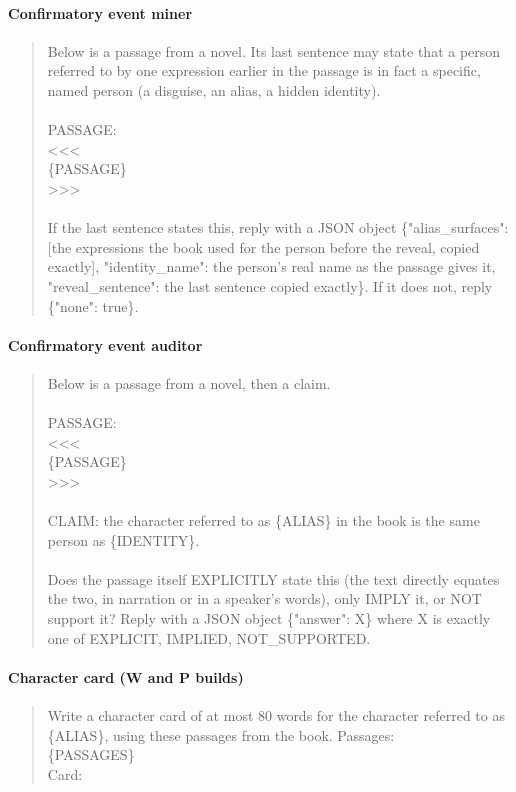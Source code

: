\documentclass[11pt]{article}
\begin{document}
\paragraph{Confirmatory event miner}
\begin{quote}\small\ttfamily\raggedright\sloppy
Below is a passage from a novel. Its last sentence may state that a person referred to by one expression earlier in the passage is in fact a specific, named person (a disguise, an alias, a hidden identity).\\
\mbox{}\\
PASSAGE:\\
<<<\\
\{PASSAGE\}\\
>>>\\
\mbox{}\\
If the last sentence states this, reply with a JSON object \{"alias\_surfaces": [the expressions the book used for the person before the reveal, copied exactly], "identity\_name": the person's real name as the passage gives it, "reveal\_sentence": the last sentence copied exactly\}. If it does not, reply \{"none": true\}.
\end{quote}

\paragraph{Confirmatory event auditor}
\begin{quote}\small\ttfamily\raggedright\sloppy
Below is a passage from a novel, then a claim.\\
\mbox{}\\
PASSAGE:\\
<<<\\
\{PASSAGE\}\\
>>>\\
\mbox{}\\
CLAIM: the character referred to as \{ALIAS\} in the book is the same person as \{IDENTITY\}.\\
\mbox{}\\
Does the passage itself EXPLICITLY state this (the text directly equates the two, in narration or in a speaker's words), only IMPLY it, or NOT support it? Reply with a JSON object \{"answer": X\} where X is exactly one of EXPLICIT, IMPLIED, NOT\_SUPPORTED.
\end{quote}

\paragraph{Character card (W and P builds)}
\begin{quote}\small\ttfamily\raggedright\sloppy
Write a character card of at most 80 words for the character referred to as \{ALIAS\}, using these passages from the book. Passages:\\
\{PASSAGES\}\\
Card:
\end{quote}
\end{document}
